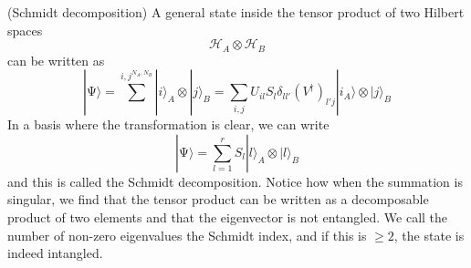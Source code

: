 \vspace{2ex}
\begin{ex}
(Schmidt decomposition) A general state inside the tensor product of two Hilbert spaces
\[\mathcal{H}_{A} \otimes \mathcal{H}_{B}\]
can be written as
\[|\mathrm{\Psi}  \rangle =\sum ^{i,j}^{N_{A},N_{B}}|i\rangle _{A}\otimes |j\rangle _{B}=\sum _{i,j}U_{il}S_{l}\delta _{ll'}(V^{\dagger })_{l'j}|i_{A}\rangle \otimes |j\rangle _{B}\]
In a basis where the transformation is clear, we can write
\[|\mathrm{\Psi} \rangle =\sum _{l=1}^{r}S_{l}|l\rangle _{A}\otimes |l\rangle _{B} \]
and this is called the Schmidt decomposition. Notice how when the summation is singular, we find that the tensor product can be written as a decomposable product of two elements and that the eigenvector is not entangled. We call the number of non-zero eigenvalues the Schmidt index, and if this is $\geq 2$, the state is indeed intangled.
\end{ex}
\vspace{2ex}

